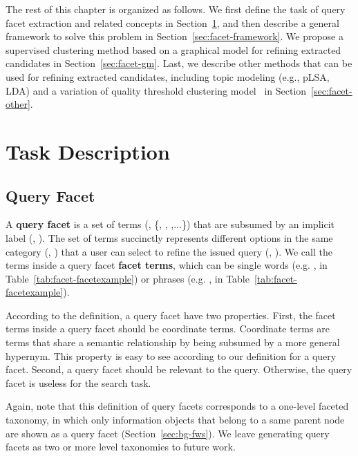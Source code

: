 The rest of this chapter is organized as follows. We first define the task of query facet extraction and related concepts in Section~\ref{sec:facet-task}, and then describe a general framework to solve this problem in Section~\ref{sec:facet-framework}. We propose a supervised clustering method based on a graphical model for refining extracted candidates in Section~\ref{sec:facet-gm}. Last, we describe other methods that can be used for refining extracted candidates, including topic modeling (e.g., pLSA, LDA) and a variation of quality threshold clustering model~\cite{dou2011finding} in Section~\ref{sec:facet-other}. 

\section{Task Description}
\label{sec:facet-task}
\subsection{Query Facet}
A \textbf{query facet} is a set of terms (\eg, \{, , ,...\}) that are subsumed by an implicit label (\eg, ). The set of terms succinctly represents different options in the same category (\eg, ) that a user can select to refine the issued query (\eg, ). We call the terms inside a query facet \textbf{facet terms}, which can be single words (e.g. ,  in Table~\ref{tab:facet-facetexample}) or phrases (e.g. ,  in Table~\ref{tab:facet-facetexample}).

According to the definition, a query facet have two properties.  
First, the facet terms inside a query facet should be coordinate terms.
Coordinate terms are terms that share a semantic relationship by being subsumed by a more general hypernym. This property is easy to see according to our definition for a query facet. Second, a query facet should be relevant to the query. Otherwise, the query facet is useless for the search task.

Again, note that this definition of query facets corresponds to a one-level faceted taxonomy, in which only information objects that belong to a same parent node are shown as a query facet (Section~\ref{sec:bg-fws}). We leave generating query facets as two or more level taxonomies to future work.

